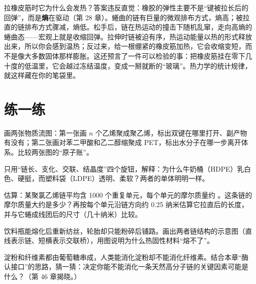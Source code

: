 \begin{tiaozhan}
拉橡皮筋时它为什么会发热？答案违反直觉：橡胶的弹性主要不是“键被拉长后的回弹”，而是\textbf{熵}在驱动（第 28 章）。蜷曲的链有巨量的微观排布方式，熵高；被拉直的链排布方式骤减，熵低。松手后，链在热运动的撞击下随机乱窜，走向高熵的蜷曲态——宏观上就是收缩回弹。拉伸时链被迫有序，热运动能量以热的形式释放出来，所以你会感到温热；反过来，给一根绷紧的橡皮筋加热，它会收缩变短，而不是像大多数固体那样膨胀。这还预言了一件可以检验的事：把橡皮筋挂在零下几十度的低温里，它会越过冻结温度，变成一掰就断的“玻璃”。热力学的统计规律，就这样藏在你的笔袋里。
\end{tiaozhan}

\section*{练一练}

\begin{sikaoti}
\item 画两张物质流图：第一张画 $n$ 个乙烯聚成聚乙烯，标出双键在哪里打开、副产物有没有；第二张画对苯二甲酸和乙二醇缩聚成 PET，标出水分子在哪一步离开体系。比较两张图的“原子账”。
\item 只用“链长、支化、交联、结晶度”四个旋钮，解释：为什么牛奶桶（HDPE）乳白色、硬挺，而塑料袋（LDPE）透明、柔软？两者的单体明明一样。
\item 估算：某聚氯乙烯链平均含 1000 个重复单元，每个单元的摩尔质量约 。这条链的摩尔质量大约是多少？再按每个单元沿链方向约 0.25 纳米估算它拉直后的长度，并与它蜷成线团后的尺寸（几十纳米）比较。
\item 饮料瓶能熔化后重新纺丝，轮胎却只能粉碎后铺路。画出两者链结构的示意图（直线表示链、短横表示交联桥），用图说明为什么热固性材料“熔不了”。
\item 淀粉和纤维素都由葡萄糖串成，人类能消化淀粉却不能消化纤维素。结合本章“酶认接口”的思路，猜一猜：决定你能不能消化一条天然高分子链的关键因素可能是什么？（第 46 章揭晓。）
\end{sikaoti}
